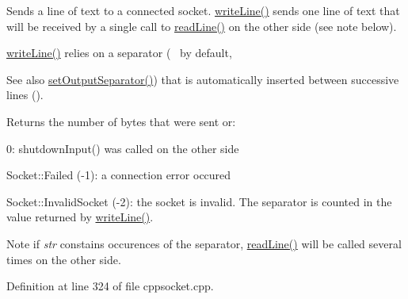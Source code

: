Sends a line of text to a connected socket. \mbox{\hyperlink{classcppu_1_1_socket_buffer_a92ae0351aaee8719d34e8c4618495d59}{write\+Line()}} sends one line of text that will be received by a single call to \mbox{\hyperlink{classcppu_1_1_socket_buffer_a222769d3776b9cbd3a727ee1f0e60358}{read\+Line()}} on the other side (see note below). 

\mbox{\hyperlink{classcppu_1_1_socket_buffer_a92ae0351aaee8719d34e8c4618495d59}{write\+Line()}} relies on a separator (~\newline
 by default, \begin{DoxySeeAlso}{See also}
\mbox{\hyperlink{classcppu_1_1_socket_buffer_a0e5e6a9ce3bda28b65c559c8b3c91b0f}{set\+Output\+Separator()}}) that is automatically inserted between successive lines ().
\end{DoxySeeAlso}
\begin{DoxyReturn}{Returns}
the number of bytes that were sent or\+:
\begin{DoxyItemize}
\item 0\+: shutdown\+Input() was called on the other side
\item Socket\+::\+Failed (-\/1)\+: a connection error occured
\item Socket\+::\+Invalid\+Socket (-\/2)\+: the socket is invalid. The separator is counted in the value returned by \mbox{\hyperlink{classcppu_1_1_socket_buffer_a92ae0351aaee8719d34e8c4618495d59}{write\+Line()}}.
\end{DoxyItemize}
\end{DoxyReturn}
\begin{DoxyNote}{Note}
if {\itshape str} constains occurences of the separator, \mbox{\hyperlink{classcppu_1_1_socket_buffer_a222769d3776b9cbd3a727ee1f0e60358}{read\+Line()}} will be called several times on the other side. 
\end{DoxyNote}


Definition at line 324 of file cppsocket.\+cpp.


